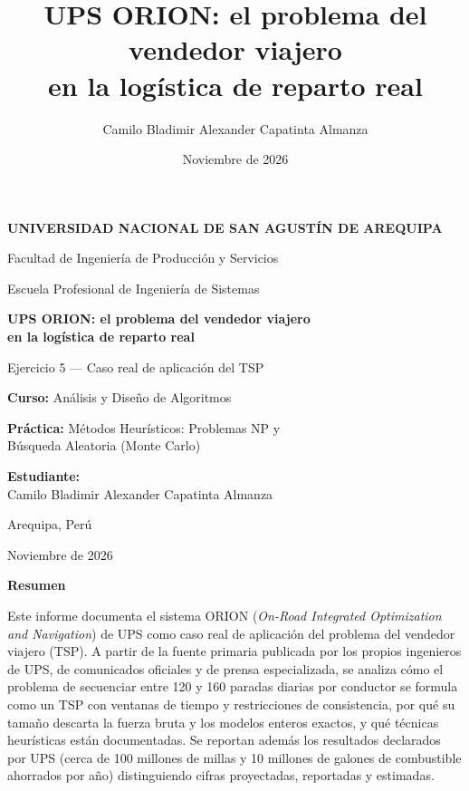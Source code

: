 \documentclass[11pt,a4paper]{article}
\title{UPS ORION: el problema del vendedor viajero\\en la logística de reparto real}
\author{Camilo Bladimir Alexander Capatinta Almanza}
\date{Noviembre de 2026}
\begin{document}
\begin{titlepage}
  \thispagestyle{empty}
  \centering
  \vspace*{1cm}
  {\large\textbf{UNIVERSIDAD NACIONAL DE SAN AGUSTÍN DE AREQUIPA}\par}
  \vspace{0.3cm}
  {\large Facultad de Ingeniería de Producción y Servicios\par}
  {\large Escuela Profesional de Ingeniería de Sistemas\par}
  \vspace{2.5cm}
  {\Large\bfseries UPS ORION: el problema del vendedor viajero\\en la logística de reparto real\par}
  \vspace{0.8cm}
  {\large Ejercicio 5 — Caso real de aplicación del TSP\par}
  \vspace{2.5cm}
  {\large\textbf{Curso:} Análisis y Diseño de Algoritmos\par}
  \vspace{0.3cm}
  {\large\textbf{Práctica:} Métodos Heurísticos: Problemas NP y\\Búsqueda Aleatoria (Monte Carlo)\par}
  \vspace{2.5cm}
  {\large\textbf{Estudiante:}\\ Camilo Bladimir Alexander Capatinta Almanza\par}
  \vfill
  {\large Arequipa, Perú\par}
  {\large Noviembre de 2026\par}
\end{titlepage}

\setcounter{page}{1}

\begin{center}\textbf{Resumen}\end{center}
\noindent\small
Este informe documenta el sistema ORION (\emph{On-Road Integrated Optimization and Navigation}) de UPS como caso real de aplicación del problema del vendedor viajero (TSP). A partir de la fuente primaria publicada por los propios ingenieros de UPS, de comunicados oficiales y de prensa especializada, se analiza cómo el problema de secuenciar entre 120 y 160 paradas diarias por conductor se formula como un TSP con ventanas de tiempo y restricciones de consistencia, por qué su tamaño descarta la fuerza bruta y los modelos enteros exactos, y qué técnicas heurísticas están documentadas. Se reportan además los resultados declarados por UPS (cerca de 100 millones de millas y 10 millones de galones de combustible ahorrados por año) distinguiendo cifras proyectadas, reportadas y estimadas.
\end{document}
